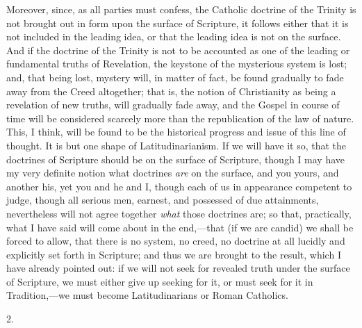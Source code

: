 Moreover, since, as all parties must confess, the Catholic doctrine
of the Trinity is not brought out in form upon the surface of
Scripture, it follows either that it is not included in the leading
idea, or that the leading idea is not on the surface. And if the
doctrine of the Trinity is not to be accounted as one of the leading
or fundamental truths of Revelation, the keystone of the mysterious
system is lost; and, that being lost, mystery will, in matter of fact,
be found gradually to fade away from the Creed altogether; that is,
the notion of Christianity as being a revelation of new truths, will
gradually fade away, and the Gospel in course of time will be
considered scarcely more than the republication of the law of nature.
This, I think, will be found to be the historical progress and issue
of this line of thought. It is but one shape of Latitudinarianism. If
we will have it so, that the doctrines of Scripture should be on the
surface of Scripture, though I may have my very definite notion what
doctrines \emph{are} on the surface, and you yours, and another his,
yet you and he and I, though each of us in appearance competent to
judge, though all serious men, earnest, and possessed of due
attainments, nevertheless will not agree together \emph{what} those
doctrines are; so that, practically, what I have said will come about
in the end,—that (if we are candid) we shall be forced to allow,
that there is no system, no creed, no doctrine at all lucidly and
explicitly set forth in Scripture; and thus we are brought to the
result, which I have already pointed out: if we will not seek for
revealed truth under the surface of Scripture, we must either give up
seeking for it, or must seek for it in Tradition,—we must become
Latitudinarians or Roman Catholics.

2.

